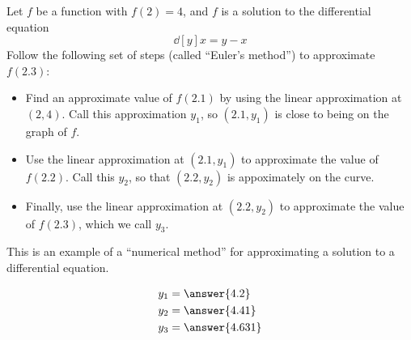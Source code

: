 \documentclass{ximera}
\author{Steven Gubkin}
\begin{document}
\begin{exercise}



Let $f$ be a function with $f(2) = 4$, and $f$ is a solution to the differential equation 
\[
\dd[y]{x} = y-x
\]
Follow the following set of steps (called ``Euler's method'') to approximate $f(2.3)$:
\begin{itemize}
\item Find an approximate value of $f(2.1)$ by using the linear approximation at $(2,4)$.  Call this approximation $y_1$, so $(2.1,y_1)$ is close to being on the graph of $f$.
\item Use the linear approximation at $(2.1,y_1)$ to approximate the value of $f(2.2)$.  Call this $y_2$, so that $(2.2,y_2)$ is appoximately on the curve.
\item Finally, use the linear approximation at $(2.2,y_2)$ to approximate the value of $f(2.3)$, which we call $y_3$.
\end{itemize}
This is an example of a ``numerical method'' for approximating a solution to a differential equation.
\begin{prompt}
\begin{align*}
  y_1 &= \answer{4.2}\\
  y_2 &= \answer{4.41}\\
  y_3 &= \answer{4.631}
\end{align*}
\end{prompt}
\end{exercise}
\end{document}
